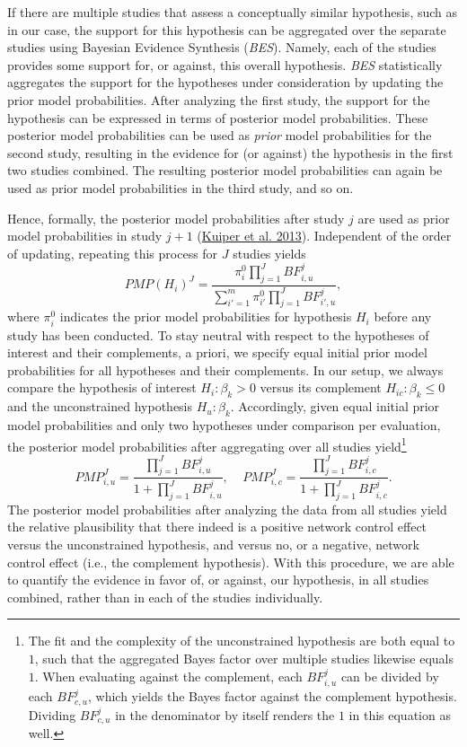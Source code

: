 \documentclass[
  11pt,
]{article}
\begin{document}
If there are multiple studies that assess a conceptually similar hypothesis, such as in our case, the support for this hypothesis can be aggregated over the separate studies using Bayesian Evidence Synthesis (\emph{BES}).
Namely, each of the studies provides some support for, or against, this overall hypothesis.
\emph{BES} statistically aggregates the support for the hypotheses under consideration by updating the prior model probabilities.
After analyzing the first study, the support for the hypothesis can be expressed in terms of posterior model probabilities.
These posterior model probabilities can be used as \emph{prior} model probabilities for the second study, resulting in the evidence for (or against) the hypothesis in the first two studies combined.
The resulting posterior model probabilities can again be used as prior model probabilities in the third study, and so on.

Hence, formally, the posterior model probabilities after study \(j\) are used as prior model probabilities in study \(j + 1\) (\protect\hyperlink{ref-kuiper_combining_2013}{Kuiper et al. 2013}).
Independent of the order of updating, repeating this process for \(J\) studies yields
\[
PMP(H_i)^J = \frac{\pi^0_{i} \prod^J_{j=1} BF^j_{i,u}}{\sum^m_{i'=1} \pi^0_{i'} \prod^J_{j=1} BF^j_{i',u}},
\]
where \(\pi^0_i\) indicates the prior model probabilities for hypothesis \(H_i\) before any study has been conducted.
To stay neutral with respect to the hypotheses of interest and their complements, a priori, we specify equal initial prior model probabilities for all hypotheses and their complements.
In our setup, we always compare the hypothesis of interest \(H_i: \beta_k > 0\) versus its complement \(H_{ic}: \beta_k \leq 0\) and the unconstrained hypothesis \(H_u: \beta_k\).
Accordingly, given equal initial prior model probabilities and only two hypotheses under comparison per evaluation, the posterior model probabilities after aggregating over all studies yield\footnote{
  The fit and the complexity of the unconstrained hypothesis are both equal to \(1\), such that the aggregated Bayes factor over multiple studies likewise equals \(1\). When evaluating against the complement, each \(BF^j_{i,u}\) can be divided by each \(BF^j_{c,u}\), which yields the Bayes factor against the complement hypothesis. Dividing \(BF^j_{c,u}\) in the denominator by itself renders the \(1\) in this equation as well.}
\[
PMP_{i,u}^J = \frac{\prod^J_{j=1}BF^j_{i,u}}{1 + \prod^J_{j=1} BF^j_{i,u}}, ~~~~~
PMP_{i,c}^J = \frac{\prod^J_{j=1}BF^j_{i,c}}{1 + \prod^J_{j=1} BF^j_{i,c}}.
\]
The posterior model probabilities after analyzing the data from all studies yield the relative plausibility that there indeed is a positive network control effect versus the unconstrained hypothesis, and versus no, or a negative, network control effect (i.e., the complement hypothesis).
With this procedure, we are able to quantify the evidence in favor of, or against, our hypothesis, in all studies combined, rather than in each of the studies individually.
\end{document}
